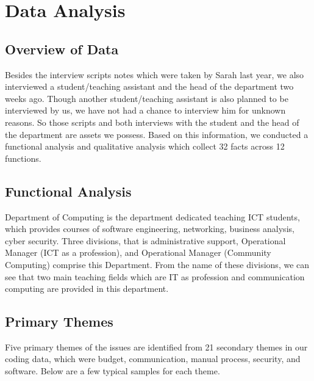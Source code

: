 
\section{Data Analysis}

\subsection{Overview of Data}

Besides the interview scripts notes which were taken by Sarah last year, we also interviewed a student/teaching assistant and the head of the department two weeks ago. Though another student/teaching assistant is also planned to be interviewed by us, we have not had a chance to interview him for unknown reasons. So those scripts and both interviews with the student and the head of the department are assets we possess. Based on this information, we conducted a functional analysis and qualitative analysis which collect 32 facts across 12 functions.

\subsection{Functional Analysis}

Department of Computing is the department dedicated teaching ICT students, which provides courses of software engineering, networking, business analysis, cyber security. Three divisions, that is administrative support, Operational Manager (ICT as a profession), and Operational Manager (Community Computing) comprise this Department. From the name of these divisions, we can see that two main teaching fields which are IT as profession and communication computing are provided in this department.

\subsection{Primary Themes}
Five primary themes of the issues are identified from 21 secondary themes in our coding data, which were budget, communication, manual process, security, and software. Below are a few typical samples for each theme.

